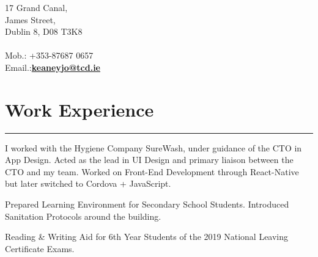 \documentclass[]{rahulworld-resume}
\begin{document}
\hfill
\begin{minipage}[t]{0.66\textwidth} 
\hspace*{0pt}\hfill 17 Grand Canal,    \\
\hspace*{0pt}\hfill James Street,    \\
\hspace*{0pt}\hfill Dublin 8, D08 T3K8\\
\hspace*{0pt}\hfill  \\
\hspace*{0pt}\hfill Mob.: +353-87687 0657 \\
\hspace*{0pt}\hfill Email.:\textbf{\href{mailto:keaneyjo@tcd.ie}{keaneyjo@tcd.ie}} \\
\section{Work Experience}
\noindent\rule{12.5cm}{0.4pt}
 
\noindent
\hspace{5em}%
\begin{minipage}{0.85\textwidth\vspace{2pt}}
I worked with the Hygiene Company SureWash, under guidance of the CTO in App Design. Acted as the lead in UI Design and primary liaison between the CTO and my team. Worked on Front-End Development through React-Native but later switched to Cordova + JavaScript.
\end{minipage}
\sectionsep

 
\noindent
\hspace{5em}%
\begin{minipage}{0.85\textwidth\vspace{2pt}}
Prepared Learning Environment for Secondary School Students. Introduced Sanitation Protocols around the building.
\end{minipage}

 
\noindent
\hspace{5em}%
\begin{minipage}{0.85\textwidth\vspace{2pt}}
Reading \& Writing Aid for 6th Year Students of the 2019 National Leaving Certificate Exams.
\end{minipage}


\end{minipage}
\end{document}
